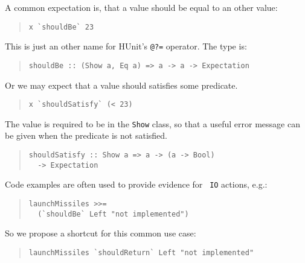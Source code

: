 \documentclass[preprint]{sigplanconf}
\begin{document}
\noindent A common expectation is, that a value should be equal to an other
value:

\begin{quote}
\small
\begin{verbatim}
x `shouldBe` 23
\end{verbatim}
\end{quote}

\noindent This is just an other name for HUnit's \texttt{@?=}
operator.  The type is:

\begin{quote}
\small
\begin{verbatim}
shouldBe :: (Show a, Eq a) => a -> a -> Expectation
\end{verbatim}
\end{quote}

\noindent Or we may expect that a value should satisfies some
predicate.

\begin{quote}
\small
\begin{verbatim}
x `shouldSatisfy` (< 23)
\end{verbatim}
\end{quote}

\noindent The value is required to be in the \texttt{Show} class, so that a
useful error message can be given when the predicate is not satisfied.

\begin{quote}
\small
\begin{verbatim}
shouldSatisfy :: Show a => a -> (a -> Bool)
  -> Expectation
\end{verbatim}
\end{quote}

\noindent Code examples are often used to provide evidence for {\tt
IO} actions, e.g.:

\begin{quote}
\small
\begin{verbatim}
launchMissiles >>=
  (`shouldBe` Left "not implemented")
\end{verbatim}
\end{quote}

\noindent So we propose a shortcut for this common use case:

\begin{quote}
\small
\begin{verbatim}
launchMissiles `shouldReturn` Left "not implemented"
\end{verbatim}
\end{quote}
\end{document}

